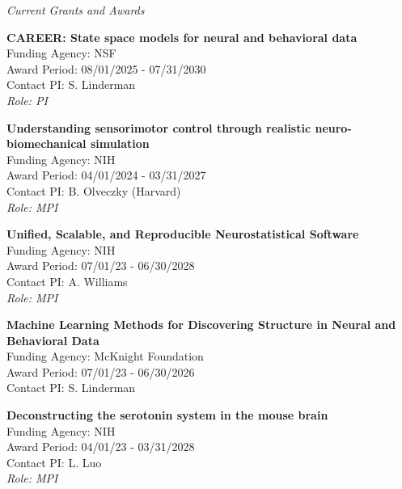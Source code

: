 \documentclass[10pt]{article}
\begin{document}
\vspace{1em}

\textit{Current Grants and Awards}

\begin{outerlist}

\item \textbf{CAREER: State space models for neural and behavioral data} \\
Funding Agency: NSF \\
Award Period: 08/01/2025 - 07/31/2030 \\
Contact PI: S. Linderman \\
\textit{Role: PI}

\item \textbf{Understanding sensorimotor control through realistic neuro-biomechanical simulation} \\
  Funding Agency: NIH \\
  Award Period: 04/01/2024 - 03/31/2027 \\
  Contact PI: B. Olveczky (Harvard) \\
  \textit{Role: MPI}

\item \textbf{Unified, Scalable, and Reproducible Neurostatistical Software} \\
  Funding Agency: NIH \\
  Award Period: 07/01/23 - 06/30/2028 \\
  Contact PI: A. Williams \\
  \textit{Role: MPI}
  
\item \textbf{Machine Learning Methods for Discovering Structure in Neural and Behavioral Data} \\
  Funding Agency: McKnight Foundation \\
  Award Period: 07/01/23 - 06/30/2026 \\
  Contact PI: S. Linderman

\item \textbf{Deconstructing the serotonin system in the mouse brain} \\
  Funding Agency: NIH \\
  Award Period: 04/01/23 - 03/31/2028 \\
  Contact PI: L. Luo \\
  \textit{Role: MPI}


\end{outerlist}
\end{document}
